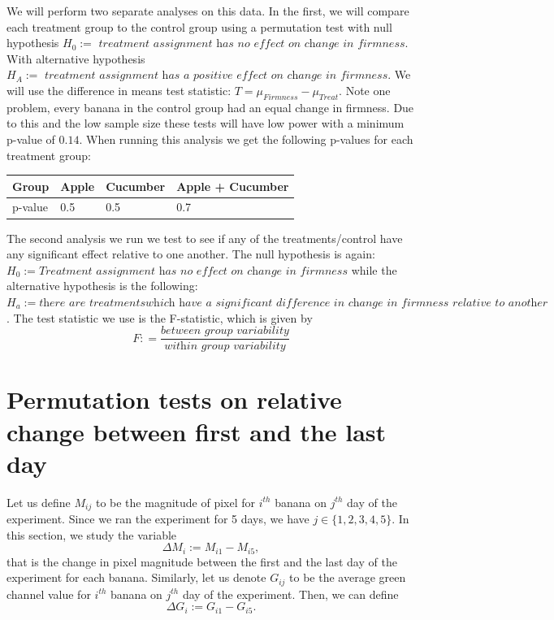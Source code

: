 \documentclass[
  12pt,
]{article}
\begin{document}
We will perform two separate analyses on this data. In the first, we
will compare each treatment group to the control group using a
permutation test with null hypothesis
\(H_0 := \textit{ treatment assignment has no effect on change in firmness}\).
With alternative hypothesis
\(H_A := \textit{ treatment assignment has a positive effect on change in firmness.}\)
We will use the difference in means test statistic:
\(T = \mu_{Firmness} - \mu_{Treat}\). Note one problem, every banana in
the control group had an equal change in firmness. Due to this and the
low sample size these tests will have low power with a minimum p-value
of \(0.14\). When running this analysis we get the following p-values
for each treatment group:

\begin{longtable}[]{@{}llll@{}}
\toprule()
Group & Apple & Cucumber & Apple + Cucumber \\
\midrule()
\endhead
p-value & 0.5 & 0.5 & 0.7 \\
\bottomrule()
\end{longtable}

The second analysis we run we test to see if any of the
treatments/control have any significant effect relative to one another.
The null hypothesis is again:
\(H_0:= \textit{Treatment assignment has no effect on change in firmness}\)
while the alternative hypothesis is the following:
\(H_a := \textit{there are treatments} \textit{which have a significant difference in change in firmness relative to another}\).
The test statistic we use is the F-statistic, which is given by
\[F: = \frac{\textit{between group variability}}{\textit{within group variability}}\]

\hypertarget{permutation-tests-on-relative-change-between-first-and-the-last-day}{%
\section{Permutation tests on relative change between first and the last
day}\label{permutation-tests-on-relative-change-between-first-and-the-last-day}}

Let us define \(M_{ij}\) to be the magnitude of pixel for \(i^{th}\)
banana on \(j^{th}\) day of the experiment. Since we ran the experiment
for 5 days, we have \(j \in \{1, 2, 3,4, 5\}\). In this section, we
study the variable \[\Delta M_i :=  M_{i1} - M_{i5},\] that is the
change in pixel magnitude between the first and the last day of the
experiment for each banana. Similarly, let us denote \(G_{ij}\) to be
the average green channel value for \(i^{th}\) banana on \(j^{th}\) day
of the experiment. Then, we can define
\[\Delta G_i := G_{i1} - G_{i5}.\]
\end{document}
